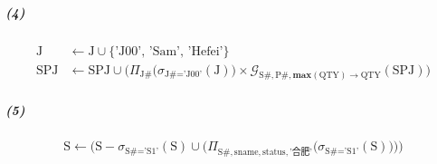 \documentclass{article}
\begin{document}
\subparagraph{(4)}
\begin{Large}
\begin{align*}
    \text{J} & \leftarrow \text{J} \cup \{\text{'J00'},\, \text{'Sam'},\, \text{'Hefei'}\} \\
    \text{SPJ} & \leftarrow \text{SPJ} \cup \Big(\Pi_{\text{J\#}}\big(\sigma_{\text{J\#} = \text{'J00'}}(\text{J})\big) \times \mathcal{G}_{\text{S\#}, \text{P\#}, \textbf{max}(\text{QTY}) \rightarrow \text{QTY}}(\text{SPJ})\Big)
\end{align*}
\end{Large}

\subparagraph{(5)}
\begin{Large}
\begin{equation*}
    \text{S} \leftarrow \bigg(\text{S} - \sigma_{\text{S\#} = \text{'S1'}}(\text{S}) \cup \Big(\Pi_{\text{S\#}, \text{sname}, \text{status}, \text{'合肥'}}\big(\sigma_{\text{S\#} = \text{'S1'}}(\text{S})\big)\Big)\bigg)
\end{equation*}
\end{Large}
\end{document}
